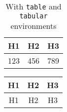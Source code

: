 \documentclass{article}
\begin{document}
\begin{table}
\centering
\caption{With \texttt{table} and \texttt{tabular} environments}\label{tab:a}
\begin{tabular}{ccc}
\hline
H1 & H2 & H3 \\
\hline
123 & 456 & 789 \\
\hline
\end{tabular}
\end{table}

\begin{longtable}{ccc}
\hline
H1 & H2 & H3 \\
\hline
H1 & H2 & H3 \\
\hline
\end{longtable}
\end{document}
